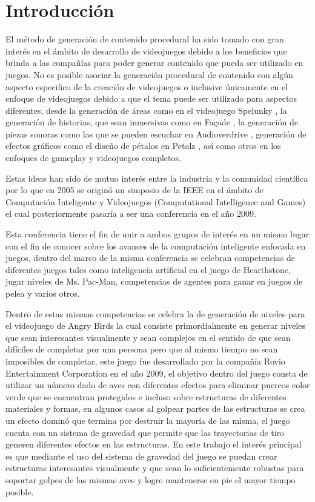 \chapter{Introducción}
\label{chapter:introduction}

El método de generación de contenido procedural ha sido tomado con
gran interés en el ámbito de desarrollo de videojuegos debido a los beneficios
que brinda a las compañías para poder generar contenido que pueda ser utilizado
en juegos. No es posible asociar la generación procedural de contenido con algún
aspecto especifico de la creación de videojuegos o inclusive únicamente en el
enfoque de videojuegos debido a que el tema puede ser utilizado para 
aspectos diferentes, desde la generación de áreas como en el videojuego Spelunky
\cite{RovioEntertainmentCorporation2009} \cite{Mossmouth2013}
\cite{Mossmouth2013}, la generación de historias, que sean inmersivas como en
Façade \cite{Mateas}, la generación de piezas sonoras como las que se pueden 
escuchar en Audioverdrive \cite{Holtar}, generación de efectos gráficos como
el diseño de pétalos en Petalz \cite{Risi2012}, así como otros en los enfoques
de gameplay y videojuegos completos.

Estas ideas han sido de mutuo interés entre la industria y la comunidad
científica por lo que en 2005 se originó un simposio de la IEEE en el ámbito de
Computación Inteligente y Videojuegos (Computational Intelligence and Games) el
cual posteriormente pasaría a ser una conferencia en el año 2009.

Esta conferencia tiene el fin de unir a ambos grupos de interés en un mismo
lugar con el fin de conocer sobre los avances de la computación inteligente
enfocada en juegos, dentro del marco de la misma conferencia se celebran
competencias de diferentes juegos tales como inteligencia artificial en el juego
de Hearthstone, jugar niveles de Ms. Pac-Man, competencias de agentes para ganar
en juegos de pelea y varios otros.

Dentro de estas mismas competencias se celebra la de generación de niveles para
el videojuego de Angry Birds la cual consiste primordialmente en generar niveles
que sean interesantes visualmente y sean complejos en el sentido de que sean
difíciles de completar por una persona pero que al mismo tiempo no sean
imposibles de completar, este juego fue desarrollado por la compañía Rovio
Entertainment Corporation\cite{RovioEntertainmentCorporation2009} en el año
2009, el objetivo dentro del juego consta de utilizar un número dado de aves con
diferentes efectos para eliminar puercos color verde que se encuentran
protegidos e incluso sobre estructuras de diferentes materiales y formas, en
algunos casos al golpear partes de las estructuras se crea un efecto dominó que
termina por destruir la mayoría de las misma, el juego cuenta con un
sistema de gravedad que permite que las trayectorias de tiro generen diferentes
efectos en las estructuras. En este trabajo el interés principal es que mediante el
uso del sistema de gravedad del juego se puedan crear estructuras
interesantes visualmente y que sean lo suficientemente robustas para soportar
golpes de las mismas aves y logre mantenerse en pie el mayor tiempo posible.

